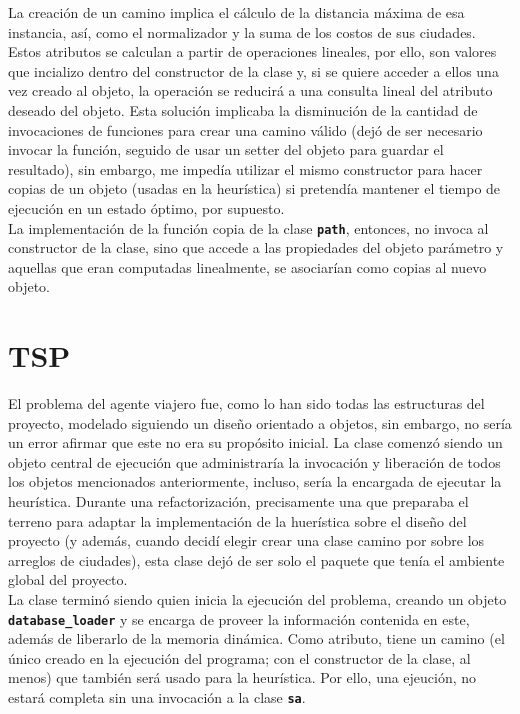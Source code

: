 \documentclass[a4paper]{report}
\begin{document}
La creaci\'on de un camino implica el c\'alculo de la distancia m\'axima de esa instancia, as\'i, como el
normalizador y la suma de los costos de sus ciudades. Estos atributos se calculan a partir de operaciones
lineales, por ello, son valores que incializo dentro del constructor de la clase y, si se quiere acceder
a ellos una vez creado al objeto, la operaci\'on se reducir\'a a una consulta lineal del atributo deseado
del objeto. Esta soluci\'on implicaba la disminuci\'on de la cantidad de invocaciones de funciones para
crear una camino v\'alido (dej\'o de ser necesario invocar la funci\'on, seguido de usar un setter del
objeto para guardar el resultado), sin embargo, me imped\'ia utilizar el mismo constructor para hacer copias
de un objeto (usadas en la heur\'istica) si pretend\'ia mantener el tiempo de ejecuci\'on en un estado
\'optimo, por supuesto.\\

La implementaci\'on de la funci\'on copia de la clase \textbf{\texttt{path}}, entonces, no invoca al
constructor de la clase, sino que accede a las propiedades del objeto par\'ametro y aquellas que eran
computadas linealmente, se asociar\'ian como copias al nuevo objeto.

\section{TSP}
El problema del agente viajero fue, como lo han sido todas las estructuras del proyecto, modelado siguiendo
un dise\~no orientado a objetos, sin embargo, no ser\'ia un error afirmar que este no era su prop\'osito inicial.
La clase comenz\'o siendo un objeto central de ejecuci\'on que administrar\'ia la invocaci\'on y liberaci\'on
de todos los objetos mencionados anteriormente, incluso, ser\'ia la encargada de ejecutar la heur\'istica.
Durante una refactorizaci\'on, precisamente una que preparaba el terreno para adaptar la implementaci\'on de
la huer\'istica sobre el dise\~no del proyecto (y adem\'as, cuando decid\'i elegir crear una clase camino por
sobre los arreglos de ciudades), esta clase dej\'o de ser solo el paquete que ten\'ia el ambiente global del
proyecto.\\

La clase termin\'o siendo quien inicia la ejecuci\'on del problema, creando un objeto
\textbf{\texttt{database\_loader}} y se encarga de proveer la informaci\'on contenida en este, adem\'as de
liberarlo de la memoria din\'amica. Como atributo, tiene un camino (el \'unico creado en la ejecuci\'on del
programa; con el constructor de la clase, al menos) que tambi\'en ser\'a usado para la heur\'istica. Por
ello, una ejeuci\'on, no estar\'a completa sin una invocaci\'on a la clase \textbf{\texttt{sa}}.
\end{document}
